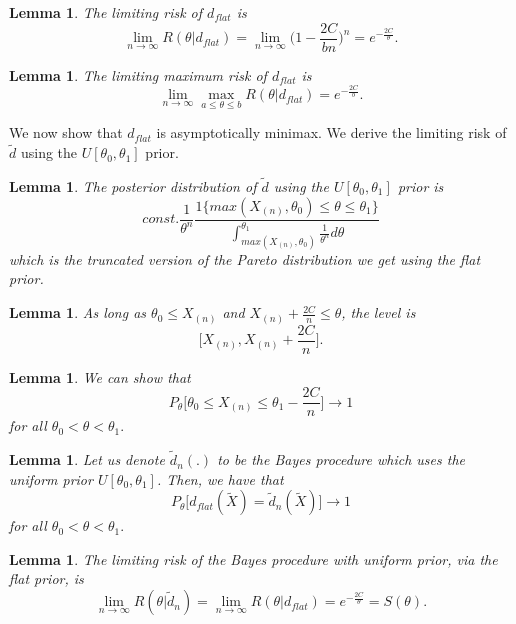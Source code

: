 \documentclass[twoside]{article}
\newtheorem{lemma}[theorem]{Lemma}
\begin{document}
\begin{lemma}The limiting risk of $d_{flat}$ is 
$$
\lim_{n \rightarrow \infty}R(\theta|d_{flat}) = \lim_{n \rightarrow \infty} \bigg(1 - \frac{2C}{bn} \bigg)^n = e^{-\frac{2C}{\theta}}.
$$
\end{lemma}

\begin{lemma}The limiting maximum risk of $d_{flat}$ is 
$$
\lim_{n \rightarrow \infty}\max_{a \leq \theta \leq b}R(\theta|d_{flat}) = e^{-\frac{2C}{b}}.
$$
\end{lemma}

We now show that $d_{flat}$ is asymptotically minimax. We derive the limiting risk of $\tilde{d}$ using the $U[\theta_0,\theta_1]$ prior.

\begin{lemma}The posterior distribution of $\tilde{d}$ using the $U[\theta_0,\theta_1]$ prior is 
$$
const.\frac{1}{\theta^n}\frac{1\{max(X_{(n)}, \theta_0) \leq \theta \leq \theta_1\}}{\int_{max(X_{(n)},\theta_0)}^{\theta_1}\frac{1}{\theta^n}d\theta}
$$
which is the truncated version of the Pareto distribution we get using the flat prior.
\end{lemma}

\begin{lemma}As long as $\theta_0 \leq X_{(n)}$ and $X_{(n)} + \frac{2C}{n} \leq \theta$, the level is 
$$
\bigg[X_{(n)}, X_{(n)} + \frac{2C}{n} \bigg].
$$
\end{lemma}


\begin{lemma}We can show that 
$$
P_{\theta}\bigg[\theta_0 \leq X_{(n)} \leq \theta_1 - \frac{2C}{n} \bigg] \rightarrow 1
$$
for all $\theta_0 < \theta < \theta_1.$
\end{lemma}

\begin{lemma}Let us denote $\tilde{d}_n(.)$ to be the Bayes procedure which uses the uniform prior $U[\theta_0, \theta_1]$. Then, we have that 
$$
P_{\theta}\bigg[d_{flat}(\tilde{X}) = \tilde{d}_n(\tilde{X}) \bigg] \rightarrow 1
$$
for all $\theta_0 < \theta < \theta_1.$
\end{lemma}

\begin{lemma}The limiting risk of the Bayes procedure with uniform prior, via the flat prior, is 
$$
\lim_{n \rightarrow \infty}R(\theta|\tilde{d}_n) = \lim_{n \rightarrow \infty}R(\theta|d_{flat}) = e^{-\frac{2C}{\theta}} = S(\theta).
$$
\end{lemma}
\end{document}
